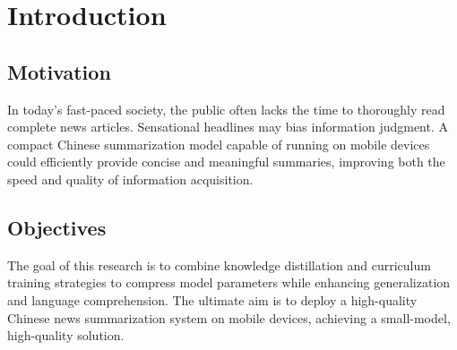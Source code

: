 
\chapter{Introduction}

\section{Motivation}
In today’s fast-paced society, the public often lacks the time to thoroughly read complete news articles. Sensational headlines may bias information judgment. A compact Chinese summarization model capable of running on mobile devices could efficiently provide concise and meaningful summaries, improving both the speed and quality of information acquisition.

\section{Objectives}

The goal of this research is to combine knowledge distillation and curriculum training strategies to compress model parameters while enhancing generalization and language comprehension. The ultimate aim is to deploy a high-quality Chinese news summarization system on mobile devices, achieving a small-model, high-quality solution.
